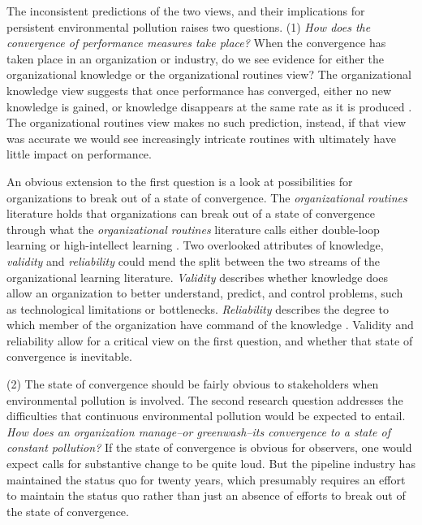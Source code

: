 The inconsistent predictions of the two views, and their implications for persistent environmental pollution raises two questions. (1) \textit{How does the convergence of performance measures take place?} When the convergence has taken place in an organization or industry, do we see evidence for either the organizational knowledge or the organizational routines view? The organizational knowledge view suggests that once performance has converged, either no new knowledge is gained, or knowledge disappears at the same rate as it is produced \citep{Argote2013-3}. The organizational routines view makes no such prediction, instead, if that view was accurate we would see increasingly intricate routines with ultimately have little impact on performance. 

An obvious extension to the first question is a look at possibilities for organizations to break out of a state of convergence. The \textit{organizational routines} literature holds that organizations can break out of a state of convergence through what the \textit{organizational routines} literature calls either double-loop learning \citep{Argyris1978} or high-intellect learning \citep{March2010}. Two overlooked attributes of knowledge, \textit{validity} and \textit{reliability} could mend the split between the two streams of the organizational learning literature. \textit{Validity} describes whether knowledge does allow an organization to better understand, predict, and control problems, such as technological limitations or bottlenecks. \textit{Reliability} describes the degree to which member of the organization have command of the knowledge \citep{Rerup2020}. Validity and reliability allow for a critical view on the first question, and whether that state of convergence is inevitable.

(2) The state of convergence should be fairly obvious to stakeholders when environmental pollution is involved. The second research question addresses the difficulties that continuous environmental pollution would be expected to entail. \textit{How does an organization manage--or greenwash--its convergence to a state of constant pollution?} If the state of convergence is obvious for observers, one would expect calls for substantive change to be quite loud. But the pipeline industry has maintained the status quo for twenty years, which presumably requires an effort to maintain the status quo rather than just an absence of efforts to break out of the state of convergence.

